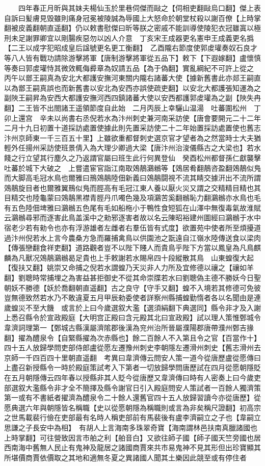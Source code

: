 　　四年春正月昕與其妹夫楊仙玉於里巷伺傑而敺之【伺相吏翻敺烏口翻】傑上表自訴曰髪膚見毁雖則痛身冠冕被陵誠為辱國上大怒命於朝堂杖殺以謝百僚【上時掌翻被皮義翻朝直遥翻】仍以敕書慰傑曰昕等朕之密戚不能訓導使陵犯衣冠雖寘以極刑未足謝罪卿宜以剛腸疾惡勿以凶人介意　丁亥宋王成器更名憲申王成義更名撝【二王以成字犯昭成皇后諡號更名更工衡翻】　乙酉隴右節度使郭䖍瓘奏奴石良才等八人皆有戰功請除游擊將軍【唐制游擊將軍從五品下】敕下【下遐嫁翻】盧懷慎等奏曰郭䖍瓘恃其微效輒侮彛章為奴請五品【為于偽翻】實亂綱紀不可許上從之　丙午以鄫王嗣真為安北大都護安撫河東關内隴右諸蕃大使【據新舊書此亦郯王嗣直以為鄫王嗣真誤也而新舊書以安北為安西亦誤使疏吏翻】以安北大都護張知運為之副陜王嗣昇為安西大都護安撫河西四鎮諸蕃大使以安西都護郭䖍瓘為之副【陜失冉翻】二王皆不出閤諸王遥領節度自此始　二月丙辰上幸驪山温湯　吐蕃圍松州　丁卯上還宫　辛未以尚書右丞倪若水為汴州刺史兼河南采訪使【唐會要開元二十二年二月十九日初置十道採訪處置使據此則先置采訪使二十二年始置採訪處置使也舊志汴州京師東一千三百五十里】上雖欲重都督刺史選京官才望者為之然當時士大夫猶輕外任揚州采訪使班景倩入為大理少卿過大梁【唐汴州治浚儀縣古之大梁也】若水餞之行立望其行塵久之乃返謂官屬曰班生此行何異登仙　癸酉松州都督孫仁獻襲擊吐蕃於城下大破之　上嘗遣宦官詣江南取鵁鶄鸂䳵等【鵁居肴翻鶄咨盈翻鵁鶄似鳬而大脚高毛冠水鳥也爾雅曰鳽鵁鶄陸佃新義曰鵁鶄闘視不流其睛交據汧出不流所謂鵁鶄旋目者也爾雅翼鳽似鳬而脛高有毛冠江東人養以厭火災又謂之交精精目精也其目精交也陸龜蒙曰鵁鶄黑襟青脛丹爪噣色幾及項鸂苦奚翻䳵恥力翻鸂䳵亦水鳥也毛有五色陸佃埤雅曰鸂䳵五色尾有毛如船柂小于鴨性食短狐在山澤中無復毒氣故淮賦云鸂䳵尋邪而逐害此鳥盖溪中之勑邪逐害者故以名云陳昭裕建州圖經曰鸂䳵于水中宿老少若有勑令也亦有浮游雄者左雌者右羣伍皆有式度】欲置苑中使者所至煩擾道過汴州倪若水上言今農桑方急而羅捕禽鳥以供園池之翫遠自江嶺水陸傳送食以梁肉【傳張戀翻食祥吏翻】道路觀者豈不以陛下賤人而貴鳥乎陛下方當以鳳皇為凡鳥麒麟為凡獸况鵁鶄鸂䳵曷足貴也上手敕謝若水賜帛四十段縱散其鳥　山東蝗復大起【復扶又翻】姚崇又命捕之倪若水謂蝗乃天災非人力所及宜修德以禳之【禳如羊翻】劉聰時常捕埋之為害益甚拒御史不從其命崇牒若水曰劉聰偽主德不勝妖今日聖朝妖不勝德【妖於喬翻朝直遥翻】古之良守【守手又翻】蝗不入境若其修德可免彼豈無德致然若水乃不敢違夏五月甲辰勑委使者詳察州縣捕蝗勤惰者各以名聞由是連歲蝗災不至大饑　或言於上曰今歲選叙大濫【選須絹翻下典選同】縣令非才及入謝上悉召縣令於宣政殿庭【大明宫正殿曰含元殿其北曰宣政殿】試以理人策惟鄄城令韋濟詞理第一【鄄城古縣漢屬濟隂郡後漢為兖州治所晉屬濮陽郡唐帶濮州鄄吉掾翻】擢為醴泉令【自緊縣擢為次赤縣也】餘二百餘人不入第且令之官【百當作十】四十五人放歸學問吏部侍郎盧從愿左遷豫州刺史李朝隱左遷滑州刺史【舊志滑州去京師一千四百四十里朝直遥翻　考異曰韋濟傳云問安人策一道今從唐歷盧從愿傳曰上盡召新授縣令一時於殿庭策試考入下第者一切放歸學問唐歷試在四月從愿朝隱貶在五月朝隱傳云四年春以授縣非其人貶今從唐歷又韋濟傳曰時有人密奏上曰今歲吏部選叙大濫縣令非才全不簡擇及縣令謝官日引入殿庭問安人策試者一百餘人獨濟策第一或有不書紙者擢濟為醴泉令二十餘人還舊官四十五人放歸習讀今亦從唐歷】從愿典選六年與朝隱皆名稱職【史以從愿朝隱為稱職則或言為非矣稱尺證翻】初高宗之世馬載裴行儉在吏部最有名時人稱吏部前有馬裴後有盧李濟嗣立之子也【韋嗣立思謙之子長安中為相】　有胡人上言海南多珠翠奇寶【海南謂林邑扶南真臘諸國也上時掌翻】可往營致因言市舶之利【舶音白】又欲往師子國【師子國天竺旁國也居西南海中舊無人民止有鬼神及龍居之諸國商賈來共市易鬼神不見其形但出珍寶顯其所堪價商賈依價取之其地和適無冬夏之異諸國人聞其土樂因此競至或有停住者